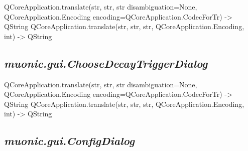 \documentclass[letterpaper,10pt,english]{sphinxmanual}
\begin{document}
\begin{fulllineitems}
\label{muonic:muonic.gui.TabWidget.tr}
QCoreApplication.translate(str, str, str disambiguation=None, QCoreApplication.Encoding encoding=QCoreApplication.CodecForTr) -\textgreater{} QString
QCoreApplication.translate(str, str, str, QCoreApplication.Encoding, int) -\textgreater{} QString

\end{fulllineitems}



\subsection{\emph{muonic.gui.ChooseDecayTriggerDialog}}
\label{muonic:muonic-gui-choosedecaytriggerdialog}\label{muonic:module-muonic.gui.ChooseDecayTriggerDialog}

\begin{fulllineitems}
\label{muonic:muonic.gui.ChooseDecayTriggerDialog.ChooseDecayTriggerDialog}
\end{fulllineitems}


\begin{fulllineitems}
\label{muonic:muonic.gui.ChooseDecayTriggerDialog.tr}
QCoreApplication.translate(str, str, str disambiguation=None, QCoreApplication.Encoding encoding=QCoreApplication.CodecForTr) -\textgreater{} QString
QCoreApplication.translate(str, str, str, QCoreApplication.Encoding, int) -\textgreater{} QString

\end{fulllineitems}



\subsection{\emph{muonic.gui.ConfigDialog}}
\label{muonic:muonic-gui-configdialog}\label{muonic:module-muonic.gui.ConfigDialog}
\end{document}
